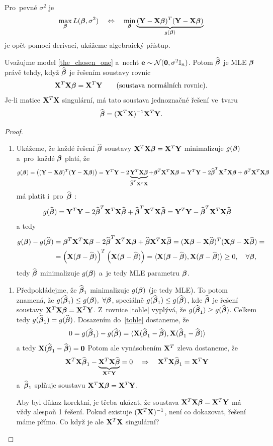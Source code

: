  Pro~pevné $\sigma^2$ je
 $$ \max_{\betab} L(\betab,\sigma^2)\quad\Leftrightarrow\quad\min_{\betab}\underbrace{(\Y-\X\betab)^T(\Y-\X\betab)}_{g(\betab)} $$
 je opět pomocí derivací, ukážeme algebraický přístup.

\newpage
 \begin{theorem}
 	Uvažujme model \eqref{the_chosen_one} a~nechť $\eb\sim\NN(\nula,\sigma^2 \In)$. Potom $\wbetab$ je MLE $\betab$ právě tehdy, když $\wbetab$ je řešením soustavy rovnic
 	 $$ \X^T\X\betab = \X^T\Y\qquad\text{(soustava normálních rovnic)}. $$
 	Je-li matice $\X^T\X$ singulární, má tato soustava jednoznačné řešení ve~tvaru
 	 $$ \wbetab = (\X^T\X)^{-1}\X^T\Y. $$
 	\begin{proof}
 		\begin{enumerate}[$\Leftarrow$]
 			\item Ukážeme, že každé řešení $\wbetab$ soustavy $\X^T\X\betab = \X^T\Y$ minimalizuje $g(\betab)$ a~pro~každé $\betab$ platí, že
 			 $$ g(\bbeta) = \left((\Y-\X\betab)^T(\Y-\X\betab)\right) = \Y^T\Y-2\underbrace{\Y^T\X\betab}_{\wbetab^T\X^T\X}+\betab^T\X^T\X\betab = \Y^T\Y-2\wbetab^T\X^T\X\betab+\betab^T\X^T\X\betab $$
 			má platit i~pro~$\wbetab$ :
 			 $$ g(\wbetab) = \Y^T\Y-2\wbetab^T\X^T\X\wbetab+\wbetab^T\X^T\X\wbetab = \Y^T\Y-\wbetab^T\X^T\X\wbetab $$
 			a tedy
 			\begin{align}
 			g(\bbeta)-g(\wbetab)& = \betab^T\X^T\X\betab-2\wbetab^T\X^T\X\betab+\wbetab\X^T\X\wbetab = (\X\betab-\X\wbetab)^T(\X\betab-\X\wbetab) = \\
 			&= \left(\X(\betab-\wbetab) \right)^T\left(\X(\betab-\wbetab) \right) = \langle \X(\betab-\wbetab),\X(\betab-\wbetab) \rangle\geq 0,\quad\forall\betab, \label{tohle}
 			\end{align}
 			 tedy $\wbetab$ minimalizuje $g(\bbeta)$ a~je tedy MLE parametru $\betab$.
 		\end{enumerate}
 	\begin{enumerate}[$\Rightarrow$]
 		\item Předpokládejme, že $\wbetab_1$ minimalizuje $g(\betab)$ (je tedy MLE). To potom znamená, že \linebreak $g(\wbetab_1)\leq g(\betab),~\forall \betab$, speciálně $g(\wbetab_1)\leq g(\wbetab)$, kde $\wbetab$ je řešení soustavy $\X^T\X\betab = \X^T\Y$. Z~rovnice \eqref{tohle} vyplývá, že $g(\wbetab_1)\geq g(\wbetab)$. Celkem tedy $g(\wbetab_1) = g(\wbetab)$. Dosazením do~\eqref{tohle} dostaneme, že
 		 $$ 0 = g(\wbetab_1)-g(\wbetab) = \langle \X(\wbetab_1-\wbetab),\X(\wbetab_1-\wbetab) \rangle $$
 		a tedy $\X(\wbetab_1-\wbetab) = \nula$ Potom ale vynásobením $\X^T$ zleva dostaneme, že
 		 $$ \X^T\X\wbetab_1 - \underbrace{\X^T\X\wbetab}_{\X^T\Y} = 0\quad\Rightarrow\quad \X^T\X\wbetab_1 = \X^T\Y $$
 		 a~$\wbetab_1$ splňuje soustavu $\X^T\X\betab = \X^T\Y$.
 		
 		Aby byl důkaz korektní, je třeba ukázat, že soustava $\X^T\X\betab = \X^T\Y$ má vždy alespoň 1 řešení. Pokud existuje $(\X^T\X)^{-1}$, není co dokazovat, řešení máme přímo. Co když je ale $\X^T\X$ singulární?
 	\end{enumerate}
 	\end{proof}
 \end{theorem}
